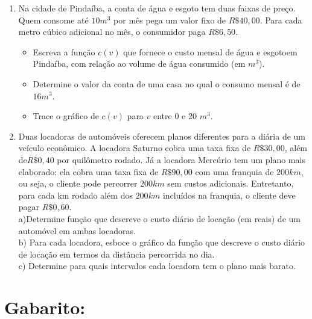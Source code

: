 \begin{enumerate}
\item Na cidade de Pindaíba, a conta de água e esgoto tem duas faixas de preço. Quem consome até $10 m^3$ por mês pega um valor fixo de $R\$ 40,00$. Para cada metro cúbico adicional no mês, o consumidor paga $R\$6,50$.
\begin{itemize}
\item[a)] Escreva a função $c(v)$ que fornece o custo mensal de água e esgotoem Pindaíba, com relação ao volume de água consumido (em $m^3$).
\item[b)] Determine o valor da conta de uma casa no qual o consumo mensal é de $16m^3$.
\item[c)]Trace o gráfico de $c(v)$ para $v$ entre 0 e 20 $m^3$.
\end{itemize}
\item Duas locadoras de automóveis oferecem planos
diferentes para a diária de um veículo econômico. A
locadora Saturno cobra uma taxa fixa de $R\$ 30,00$, além
de$ R\$ 0,40$ por quilômetro rodado. Já a locadora
Mercúrio tem um plano mais elaborado: ela cobra uma
taxa fixa de $R\$ 90,00$ com uma franquia de $200 km$, ou
seja, o cliente pode percorrer $200 km$ sem custos adicionais. Entretanto, para cada km rodado além dos $200 km$
incluídos na franquia, o cliente deve pagar $R\$ 0,60$. \\

a)Determine  função que descreve o custo diário de locação (em reais) de um automóvel em ambas locadoras. \\
b) Para cada locadora, esboce o gráfico da
função que descreve o custo diário de locação em
termos da distância percorrida no dia. \\
c) Determine para quais intervalos cada locadora tem o
plano mais barato.
\end{enumerate}

\section{Gabarito:}

